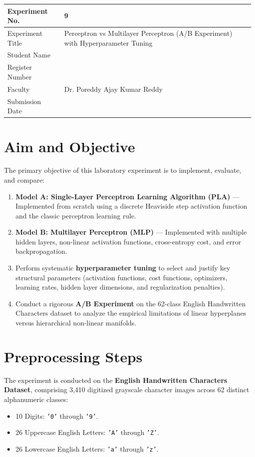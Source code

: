 \documentclass[12pt,a4paper]{article}
\begin{document}
\begin{tabular}{|p{4cm}|p{11.5cm}|}
\hline
Experiment No. & 9 \\ \hline
Experiment Title & Perceptron vs Multilayer Perceptron (A/B Experiment) with Hyperparameter Tuning \\ \hline
Student Name & \\ \hline
Register Number & \\ \hline
Faculty & Dr. Poreddy Ajay Kumar Reddy \\ \hline
Submission Date & \\ \hline
\end{tabular}

\vspace{0.5cm}

\section{Aim and Objective}
The primary objective of this laboratory experiment is to implement, evaluate, and compare:
\begin{enumerate}[label=\alph*)]
\item \textbf{Model A: Single-Layer Perceptron Learning Algorithm (PLA)} --- Implemented from scratch using a discrete Heaviside step activation function and the classic perceptron learning rule.
\item \textbf{Model B: Multilayer Perceptron (MLP)} --- Implemented with multiple hidden layers, non-linear activation functions, cross-entropy cost, and error backpropagation.
\item Perform systematic \textbf{hyperparameter tuning} to select and justify key structural parameters (activation functions, cost functions, optimizers, learning rates, hidden layer dimensions, and regularization penalties).
\item Conduct a rigorous \textbf{A/B Experiment} on the 62-class English Handwritten Characters dataset to analyze the empirical limitations of linear hyperplanes versus hierarchical non-linear manifolds.
\end{enumerate}

\section{Preprocessing Steps}
The experiment is conducted on the \textbf{English Handwritten Characters Dataset}, comprising 3,410 digitized grayscale character images across 62 distinct alphanumeric classes:
\begin{itemize}
\item 10 Digits: \texttt{'0'} through \texttt{'9'}.
\item 26 Uppercase English Letters: \texttt{'A'} through \texttt{'Z'}.
\item 26 Lowercase English Letters: \texttt{'a'} through \texttt{'z'}.
\end{itemize}
\end{document}
